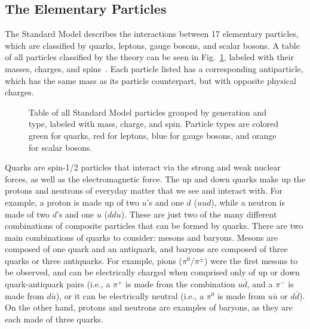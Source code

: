 
\subsection{The Elementary Particles}
\label{subsec:particles}

The Standard Model describes the interactions between 17 elementary particles, which are classified by quarks, leptons, gauge bosons, and scalar bosons.
A table of all particles classified by the theory can be seen in Fig.~\ref{fig:standardModel}, labeled with their masses, charges, and spins~\cite{PhysRevD.98.030001}.
Each particle listed has a corresponding antiparticle, which has the same mass as its particle counterpart, but with opposite physical charges.

\begin{figure}[htbp]
  \centering
  
  \caption{Table of all Standard Model particles grouped by generation and type, labeled with mass, charge, and spin. Particle types are colored green for quarks, red for leptons, blue for gauge bosons, and orange for scalar bosons.}
  \label{fig:standardModel}
\end{figure}

Quarks are spin-1/2 particles that interact via the strong and weak nuclear forces, as well as the electromagnetic force.
The up and down quarks make up the protons and neutrons of everyday matter that we see and interact with.
For example, a proton is made up of two $u$'s and one $d$ ($uud$), while a neutron is made of two $d$'s and one $u$ ($ddu$).
These are just two of the many different combinations of composite particles that can be formed by quarks.
There are two main combinations of quarks to consider: mesons and baryons.
Mesons are composed of one quark and an antiquark, and baryons are composed of three quarks or three antiquarks. %
For example, pions ($\pi^0$/$\pi^\pm$) were the first mesons to be observed, and can be electrically charged when comprised only of up or down quark-antiquark pairs (i.e., a $\pi^+$ is made from the combination $u\bar{d}$, and a $\pi^-$ is made from $d\bar{u}$), or it can be electrically neutral (i.e., a $\pi^0$ is made from $u\bar{u}$ or $d\bar{d}$). %
On the other hand, protons and neutrons are examples of baryons, as they are each made of three quarks.

